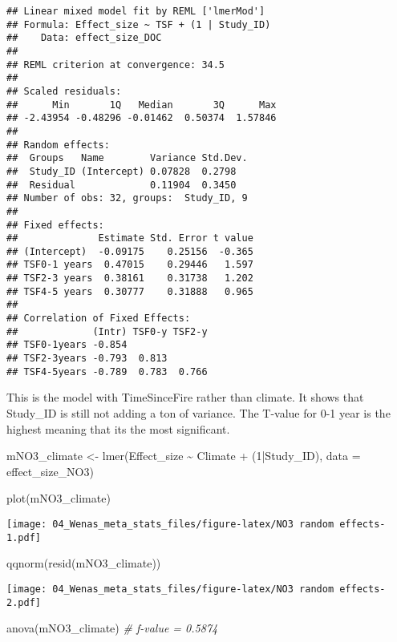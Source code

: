 \documentclass[
]{article}
\newenvironment{Shaded}{\begin{snugshade}}{\end{snugshade}}
\newcommand{\AttributeTok}[1]{\textcolor[rgb]{0.77,0.63,0.00}{#1}}
\newcommand{\CommentTok}[1]{\textcolor[rgb]{0.56,0.35,0.01}{\textit{#1}}}
\newcommand{\DecValTok}[1]{\textcolor[rgb]{0.00,0.00,0.81}{#1}}
\newcommand{\FunctionTok}[1]{\textcolor[rgb]{0.00,0.00,0.00}{#1}}
\newcommand{\NormalTok}[1]{#1}
\newcommand{\OtherTok}[1]{\textcolor[rgb]{0.56,0.35,0.01}{#1}}
\newcommand{\SpecialCharTok}[1]{\textcolor[rgb]{0.00,0.00,0.00}{#1}}
\begin{document}
\begin{verbatim}
## Linear mixed model fit by REML ['lmerMod']
## Formula: Effect_size ~ TSF + (1 | Study_ID)
##    Data: effect_size_DOC
## 
## REML criterion at convergence: 34.5
## 
## Scaled residuals: 
##      Min       1Q   Median       3Q      Max 
## -2.43954 -0.48296 -0.01462  0.50374  1.57846 
## 
## Random effects:
##  Groups   Name        Variance Std.Dev.
##  Study_ID (Intercept) 0.07828  0.2798  
##  Residual             0.11904  0.3450  
## Number of obs: 32, groups:  Study_ID, 9
## 
## Fixed effects:
##              Estimate Std. Error t value
## (Intercept)  -0.09175    0.25156  -0.365
## TSF0-1 years  0.47015    0.29446   1.597
## TSF2-3 years  0.38161    0.31738   1.202
## TSF4-5 years  0.30777    0.31888   0.965
## 
## Correlation of Fixed Effects:
##             (Intr) TSF0-y TSF2-y
## TSF0-1years -0.854              
## TSF2-3years -0.793  0.813       
## TSF4-5years -0.789  0.783  0.766
\end{verbatim}

This is the model with TimeSinceFire rather than climate. It shows that
Study\_ID is still not adding a ton of variance. The T-value for 0-1
year is the highest meaning that its the most significant.

\begin{Shaded}
\begin{Highlighting}[]
\NormalTok{mNO3\_climate }\OtherTok{\textless{}{-}} \FunctionTok{lmer}\NormalTok{(Effect\_size }\SpecialCharTok{\textasciitilde{}}\NormalTok{ Climate }\SpecialCharTok{+}\NormalTok{ (}\DecValTok{1}\SpecialCharTok{|}\NormalTok{Study\_ID), }\AttributeTok{data =}\NormalTok{ effect\_size\_NO3)}

\FunctionTok{plot}\NormalTok{(mNO3\_climate)}
\end{Highlighting}
\end{Shaded}

\texttt{[image: 04\_Wenas\_meta\_stats\_files/figure-latex/NO3 random effects-1.pdf]}

\begin{Shaded}
\begin{Highlighting}[]
\FunctionTok{qqnorm}\NormalTok{(}\FunctionTok{resid}\NormalTok{(mNO3\_climate))}
\end{Highlighting}
\end{Shaded}

\texttt{[image: 04\_Wenas\_meta\_stats\_files/figure-latex/NO3 random effects-2.pdf]}

\begin{Shaded}
\begin{Highlighting}[]
\FunctionTok{anova}\NormalTok{(mNO3\_climate) }\CommentTok{\# f{-}value = 0.5874}
\end{Highlighting}
\end{Shaded}
\end{document}
